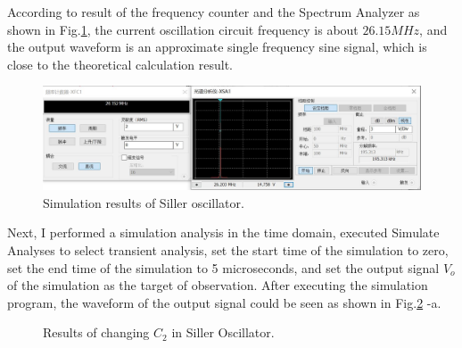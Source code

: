 \documentclass[conference]{IEEEtran}
\begin{document}
According to result of the frequency counter and the Spectrum Analyzer as shown in Fig.\ref{fig5-17}, the current oscillation circuit frequency is about $26.15MHz$, and the output waveform is an approximate single frequency sine signal, which is close to the theoretical calculation result. 
\begin{figure}[!h]
\centerline{\includegraphics[scale=0.2]{fig/pic5-17.jpg}}
\caption{Simulation results of Siller oscillator.}
\label{fig5-17}
\end{figure}

Next, I performed a simulation analysis in the time domain, executed Simulate Analyses to select transient analysis, set the start time of the simulation to zero, set the end time of the simulation to 5 microseconds, and set the output signal $V_o$ of the simulation as the target of observation. After executing the simulation program, the waveform of the output signal could be seen as shown in Fig.\ref{fig5-18/19/20} -a. 

\begin{figure}[!h]
\centering
{}
\quad
{}
\quad
{}
\caption{Results of changing $C_2$ in Siller Oscillator.}
\label{fig5-18/19/20}
\end{figure}
\end{document}
